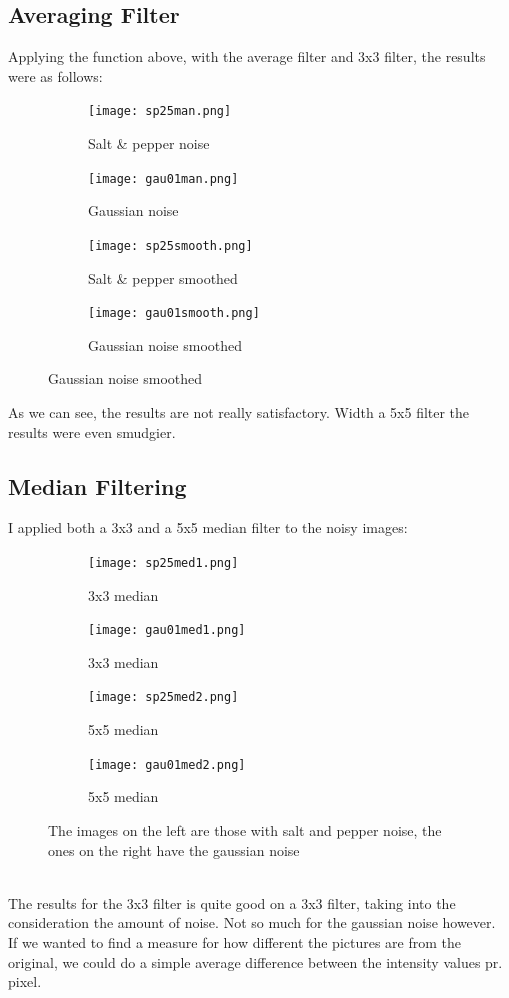 \documentclass{article}
\begin{document}
\subsection{Averaging Filter}
Applying the function above, with the average filter and 3x3 filter, the results were as follows:
\begin{figure}[h]
	\centering
	\begin{subfigure}[t]{0.45\textwidth}
		\texttt{[image: sp25man.png]}
		\label{fig:sp25man.png}
		\caption{Salt \& pepper noise}
	\end{subfigure}
	\begin{subfigure}[t]{0.45\textwidth}
		\texttt{[image: gau01man.png]}
		\label{fig:gau01man.png}
		\caption[t]{Gaussian noise}
	\end{subfigure}
	\begin{subfigure}[b]{0.45\textwidth}
		\texttt{[image: sp25smooth.png]}
		\caption{Salt \& pepper smoothed}
		\label{fig:sp25smooth.png}
	\end{subfigure}
	\begin{subfigure}[b]{0.45\textwidth}
		\texttt{[image: gau01smooth.png]}
		\caption{Gaussian noise smoothed}
		\label{fig:gau01smooth.png}
	\end{subfigure}
\end{figure}

As we can see, the results are not really satisfactory. Width a 5x5 filter the results were even smudgier.

\newpage
\subsection{Median Filtering}
I applied both a 3x3 and a 5x5 median filter to the noisy images:
\begin{figure}[h!]
	\centering
	\begin{subfigure}[t]{0.4\textwidth}
		\texttt{[image: sp25med1.png]}
		\caption{3x3 median}
		\label{fig:sp25med1.png}
	\end{subfigure}
	\begin{subfigure}[t]{0.4\textwidth}
		\texttt{[image: gau01med1.png]}
		\caption{3x3 median}
		\label{fig:gau01med1.png}
	\end{subfigure}
	\begin{subfigure}[t]{0.4\textwidth}
		\texttt{[image: sp25med2.png]}
		\caption{5x5 median}
		\label{fig:sp25med2.png}
	\end{subfigure}
	\begin{subfigure}[t]{0.4\textwidth}
		\texttt{[image: gau01med2.png]}
		\caption{5x5 median}
		\label{fig:gau01med2.png}
	\end{subfigure}
	\caption{The images on the left are those with salt and pepper noise, the ones on the right have the gaussian noise}
\end{figure}
\\The results for the 3x3 filter is quite good on a 3x3 filter, taking into the consideration the amount of noise. Not so much for the gaussian noise however.
\\If we wanted to find a measure for how different the pictures are from the original, we could do a simple average difference between the intensity values pr. pixel.
\end{document}
